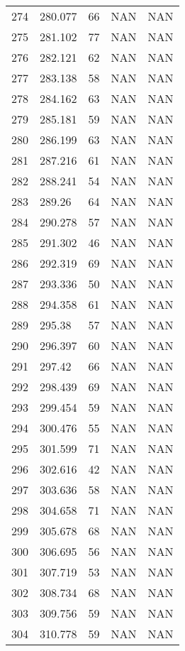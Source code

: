 \documentclass{article}
\begin{document}
\begin{longtable}{@{}lllll@{}}
				274 & 280.077 & 66    & NAN   & NAN   \\
				275 & 281.102 & 77    & NAN   & NAN   \\
				276 & 282.121 & 62    & NAN   & NAN   \\
				277 & 283.138 & 58    & NAN   & NAN   \\
				278 & 284.162 & 63    & NAN   & NAN   \\
				279 & 285.181 & 59    & NAN   & NAN   \\
				280 & 286.199 & 63    & NAN   & NAN   \\
				281 & 287.216 & 61    & NAN   & NAN   \\
				282 & 288.241 & 54    & NAN   & NAN   \\
				283 & 289.26  & 64    & NAN   & NAN   \\
				284 & 290.278 & 57    & NAN   & NAN   \\
				285 & 291.302 & 46    & NAN   & NAN   \\
				286 & 292.319 & 69    & NAN   & NAN   \\
				287 & 293.336 & 50    & NAN   & NAN   \\
				288 & 294.358 & 61    & NAN   & NAN   \\
				289 & 295.38  & 57    & NAN   & NAN   \\
				290 & 296.397 & 60    & NAN   & NAN   \\
				291 & 297.42  & 66    & NAN   & NAN   \\
				292 & 298.439 & 69    & NAN   & NAN   \\
				293 & 299.454 & 59    & NAN   & NAN   \\
				294 & 300.476 & 55    & NAN   & NAN   \\
				295 & 301.599 & 71    & NAN   & NAN   \\
				296 & 302.616 & 42    & NAN   & NAN   \\
				297 & 303.636 & 58    & NAN   & NAN   \\
				298 & 304.658 & 71    & NAN   & NAN   \\
				299 & 305.678 & 68    & NAN   & NAN   \\
				300 & 306.695 & 56    & NAN   & NAN   \\
				301 & 307.719 & 53    & NAN   & NAN   \\
				302 & 308.734 & 68    & NAN   & NAN   \\
				303 & 309.756 & 59    & NAN   & NAN   \\
				304 & 310.778 & 59    & NAN   & NAN   \\

\end{longtable}
\end{document}
